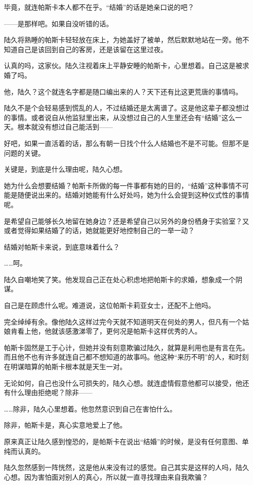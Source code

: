 毕竟，就连帕斯卡本人都不在乎。“结婚”的话是她亲口说的吧？

——是那样吧。如果自没听错的话。

陆久将熟睡的帕斯卡轻轻放在床上，为她盖好了被单，然后默默地站在一旁。他不知道自己是该回到自己的客房，还是该留在这里过夜。

认真的吗，这家伙。陆久注视着床上平静安睡的帕斯卡，心里想着。自己这是被求婚了吗。

他，陆久？这个就连名字都是随口编出来的人？天下还有比这更荒唐的事情吗。

陆久不是个会轻易感到慌乱的人，不过结婚还是太离谱了。这是他这辈子都没想过的事情。或者说自从他监狱里出来，从没想过自己的人生里还会有“结婚”这么一天。根本就没有想过自己能活到——

好吧，如果一直活着的话，那么有朝一日找个什么人结婚也不是不可能。但那不是问题的关键。

关键是，到底是什么理由呢，陆久心想。

她为什么会想要结婚？帕斯卡所做的每一件事都有她的目的，“结婚”这种事情不可能是随便说出来的。结婚对她能有什么好处吗，她为什么会提到这种仪式性的事情呢。

是希望自己能够长久地留在她身边？还是希望自己以另外的身份栖身于实验室？又或者觉得如果结婚了的话，她就能更好地控制自己的一举一动？

结婚对帕斯卡来说，到底意味着什么？

……呵。

陆久自嘲地笑了笑。他发现自己正在处心积虑地把帕斯卡的求婚，想象成一个阴谋。

自己是在顾虑什么呢。难道说，这位帕斯卡莉亚女士，还配不上他吗。

完全绰绰有余。像他陆久这样过完今天就不知道明天在何处的男人，但凡有一个姑娘肯看上他，他就该感激涕零了，更何况是帕斯卡这样优秀的人。

帕斯卡固然是工于心计，但她并没有刻意欺骗过陆久，就算是利用也是有言在先。而且他不也有许多就连自己都不想知道的故事吗。他这种“来历不明”的人，和时刻在明谋暗算的帕斯卡根本就是天生一对。

无论如何，自己也没什么可损失的，陆久心想。就连虚情假意他都可以接受，他还有什么理由拒绝呢？除非——

……除非，陆久心里想着。他忽然意识到自己在害怕什么。

除非，帕斯卡是，真心实意地爱上了他。

原来真正让陆久感到惶恐的，是帕斯卡在说出“结婚”的时候，是没有任何意图、单纯而认真的。

陆久忽然感到一阵恍然，这是他从来没有过的感觉。自己其实是这样的人吗，陆久心想。因为害怕面对别人的真心，所以就一直寻找理由来自我欺骗？


